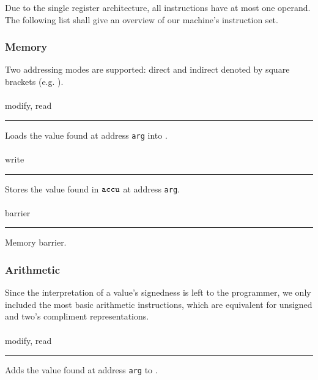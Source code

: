 Due to the single register architecture, all instructions have at most one operand.
The following list shall give an overview of our machine's instruction set.

\newcommand{\defop}[3]{
  \paragraph{#1} \hfill #2
  \rule[0.5\baselineskip]{\textwidth}{0.1pt}\vspace{-0.5\baselineskip}\par\noindent
  #3
}


\subsubsection*{Memory}

Two addressing modes are supported: direct and indirect denoted by square brackets (e.g. ).

\defop
{}
{modify, read}
{Loads the value found at address \texttt{arg} into \ACCU.}

\defop
{}
{write}
{Stores the value found in $\texttt{accu}$ at address \texttt{arg}.}

\defop
{}
{barrier}
{Memory barrier.}

\subsubsection*{Arithmetic}

Since the interpretation of a value's signedness is left to the programmer, we only included the most basic arithmetic instructions, which are equivalent for unsigned and two's compliment representations.

\defop
{}
{modify, read}
{Adds the value found at address \texttt{arg} to \ACCU.}

